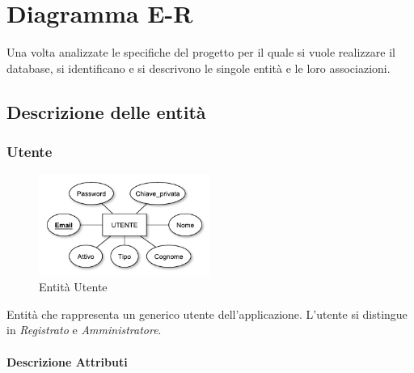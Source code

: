 
\chapter{Diagramma E-R}
\label{cap:diagramma}

Una volta analizzate le specifiche del progetto per il quale si vuole realizzare il database, si identificano e si descrivono le singole entità e le loro associazioni.

\section{Descrizione delle entità}
	
	\subsection{Utente}
	
		\begin{figure}[h]
			\centering
			\includegraphics[width=0.5\textwidth]
			{immagini/01-utente}
			
			\caption{Entità Utente}
		\end{figure}
		
		Entità che rappresenta un generico utente dell'applicazione. L'utente si distingue in \emph{Registrato} e \emph{Amministratore}.
		
		\subsubsection*{Descrizione Attributi}
		
